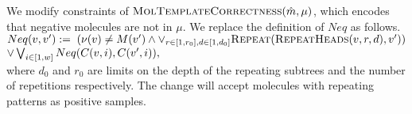 We modify constraints of $ \textsc{MolTemplateCorrectness}(\hat{m},\mu)$, which encodes that negative molecules are not in $\mu$. We replace the definition of $Neq$ as follows.\\
$Neq(v, v') :=\; (\nu(v) \neq M(v') \land \lor_{r\in[1,r_0],d\in[1,d_0]}\textsc{Repeat}(\textsc{RepeatHeads}(v,r,d), v')) $\\
\mbox{}\hspace{30mm}$\lor \bigvee_{{i \in [1,w]}} Neq( C(v,i), C(v',i ) ),$\\
where $d_0$ and $r_0$ are limits on the depth of the repeating subtrees and the number of repetitions respectively.
The change will accept molecules with repeating patterns as positive samples.

